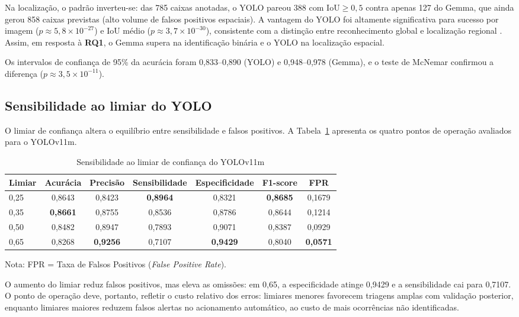 \documentclass[kdmile,a4paper]{kdmile}
\begin{document}
Na localização, o padrão inverteu-se: das 785 caixas anotadas, o YOLO pareou 388 com $\mathrm{IoU} \ge 0,5$ contra apenas 127 do Gemma, que ainda gerou 858 caixas previstas (alto volume de falsos positivos espaciais). A vantagem do YOLO foi altamente significativa para sucesso por imagem ($p \approx 5,8 \times 10^{-27}$) e IoU médio ($p \approx 3,7 \times 10^{-30}$), consistente com a distinção entre reconhecimento global e localização regional \cite{Lin2024VLSAM}. Assim, em resposta à \textbf{RQ1}, o Gemma supera na identificação binária e o YOLO na localização espacial.

Os intervalos de confiança de 95\% da acurácia foram 0,833--0,890 (YOLO) e 0,948--0,978 (Gemma), e o teste de McNemar confirmou a diferença ($p \approx 3,5 \times 10^{-11}$).


\subsection{Sensibilidade ao limiar do YOLO}
\label{sec:sensibilidade-limiar}

O limiar de confiança altera o equilíbrio entre sensibilidade e falsos positivos. A Tabela~\ref{tab:limiar_yolo} apresenta os quatro pontos de operação avaliados para o YOLOv11m.

\begin{table}[htbp]
\centering
\footnotesize
\caption{Sensibilidade ao limiar de confiança do YOLOv11m}
\label{tab:limiar_yolo}
\begin{tabular}{lcccccc}
\toprule
\textbf{Limiar} & \textbf{Acurácia} & \textbf{Precisão} & \textbf{Sensibilidade} & \textbf{Especificidade} & \textbf{F1-score} & \textbf{FPR} \\
\midrule
0,25 & 0,8643 & 0,8423 & \textbf{0,8964} & 0,8321 & \textbf{0,8685} & 0,1679 \\
0,35 & \textbf{0,8661} & 0,8755 & 0,8536 & 0,8786 & 0,8644 & 0,1214 \\
0,50 & 0,8482 & 0,8947 & 0,7893 & 0,9071 & 0,8387 & 0,0929 \\
0,65 & 0,8268 & \textbf{0,9256} & 0,7107 & \textbf{0,9429} & 0,8040 & \textbf{0,0571} \\
\bottomrule
\end{tabular}
\par\smallskip\raggedright
\scriptsize Nota: FPR = Taxa de Falsos Positivos (\emph{False Positive Rate}).
\end{table}

O aumento do limiar reduz falsos positivos, mas eleva as omissões: em 0,65, a especificidade atinge 0,9429 e a sensibilidade cai para 0,7107. O ponto de operação deve, portanto, refletir o custo relativo dos erros: limiares menores favorecem triagens amplas com validação posterior, enquanto limiares maiores reduzem falsos alertas no acionamento automático, ao custo de mais ocorrências não identificadas.
\end{document}
